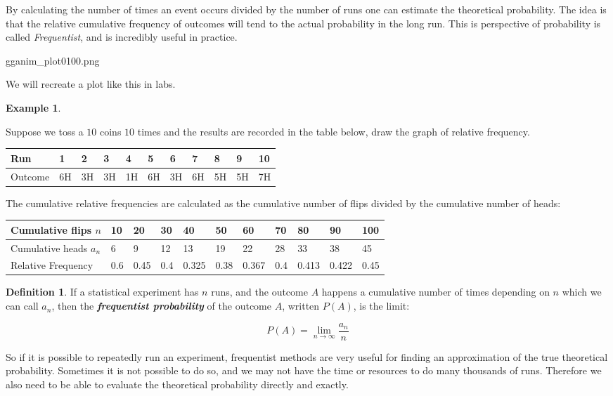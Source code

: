 \documentclass[
]{book}
\theoremstyle{definition}
\newtheorem{definition}{Definition}[chapter]
\theoremstyle{definition}
\newtheorem{example}{Example}[chapter]
\theoremstyle{definition}
\theoremstyle{definition}
\theoremstyle{remark}
\begin{document}
By calculating the number of times an event occurs divided by the number of runs one can estimate the theoretical probability. The idea is that the relative cumulative frequency of outcomes will tend to the actual probability in the long run. This is perspective of probability is called \emph{Frequentist}, and is incredibly useful in practice.

gganim\_plot0100.png

We will recreate a plot like this in labs.

\begin{example}
\protect\hypertarget{exm:freq}{}\label{exm:freq}

Suppose we toss a \(10\) coins \(10\) times and the results are recorded in the table below, draw the graph of relative frequency.

\begin{longtable}[]{@{}lllllllllll@{}}
\toprule
Run & 1 & 2 & 3 & 4 & 5 & 6 & 7 & 8 & 9 & 10\tabularnewline
\midrule
\endhead
Outcome & 6H & 3H & 3H & 1H & 6H & 3H & 6H & 5H & 5H & 7H\tabularnewline
\bottomrule
\end{longtable}

The cumulative relative frequencies are calculated as the cumulative number of flips divided by the cumulative number of heads:

\begin{longtable}[]{@{}lllllllllll@{}}
\toprule
Cumulative flips \(n\) & 10 & 20 & 30 & 40 & 50 & 60 & 70 & 80 & 90 & 100\tabularnewline
\midrule
\endhead
Cumulative heads \(a_n\) & 6 & 9 & 12 & 13 & 19 & 22 & 28 & 33 & 38 & 45\tabularnewline
Relative Frequency & 0.6 & 0.45 & 0.4 & 0.325 & 0.38 & 0.367 & 0.4 & 0.413 & 0.422 & 0.45\tabularnewline
\bottomrule
\end{longtable}

\end{example}

\begin{definition}
\protect\hypertarget{def:freq}{}\label{def:freq}If a statistical experiment has \(n\) runs, and the outcome \(A\) happens a cumulative number of times depending on \(n\) which we can call \(a_n\), then the \textbf{\emph{frequentist probability}} of the outcome \(A\), written \(P(A)\), is the limit:

\[P(A) = \lim_{n\to \infty} \frac{a_n}{n}\]
\end{definition}

So if it is possible to repeatedly run an experiment, frequentist methods are very useful for finding an approximation of the true theoretical probability. Sometimes it is not possible to do so, and we may not have the time or resources to do many thousands of runs. Therefore we also need to be able to evaluate the theoretical probability directly and exactly.
\end{document}
